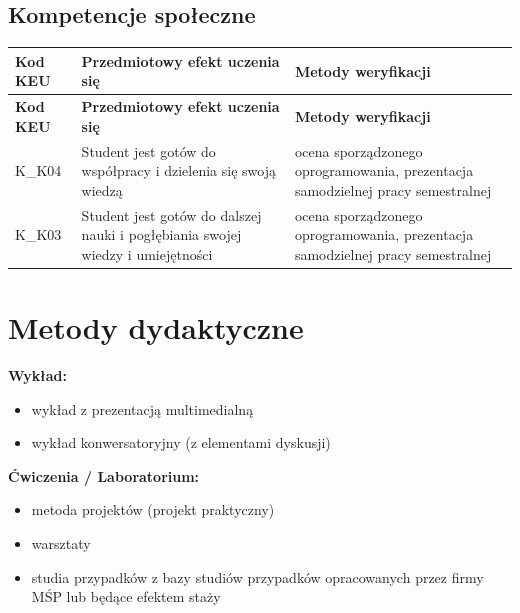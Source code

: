 \documentclass[12pt, a4paper]{article}
\newcommand{\thdrule}{\noalign{\global\setlength{\extrarowheight}{0pt}}}
\newcommand{\thdend}{\noalign{\global\setlength{\extrarowheight}{3pt}}}
\begin{document}
\subsection*{Kompetencje społeczne}
{\scriptsize
\begin{longtable}{m{1.6cm}m{9.0cm}m{4.2cm}}
\thdrule\toprule
\rowcolor{pjatkRed} {\color{white}\footnotesize\textbf{\vphantom{Ag}Kod KEU}} & {\color{white}\footnotesize\textbf{\vphantom{Ag}Przedmiotowy efekt uczenia się}} & {\color{white}\footnotesize\textbf{\vphantom{Ag}Metody weryfikacji}} \\
\midrule\thdend
\endfirsthead
\thdrule\toprule
\rowcolor{pjatkRed} {\color{white}\footnotesize\textbf{\vphantom{Ag}Kod KEU}} & {\color{white}\footnotesize\textbf{\vphantom{Ag}Przedmiotowy efekt uczenia się}} & {\color{white}\footnotesize\textbf{\vphantom{Ag}Metody weryfikacji}} \\
\midrule\thdend
\endhead
  \rowcolor{tableRowLight} K\_K04 & Student jest gotów do współpracy i dzielenia się swoją wiedzą & ocena sporządzonego oprogramowania, prezentacja samodzielnej pracy semestralnej \\
  \rowcolor{tableRowAlt} K\_K03 & Student jest gotów do dalszej nauki i pogłębiania swojej wiedzy i umiejętności & ocena sporządzonego oprogramowania, prezentacja samodzielnej pracy semestralnej \\
\bottomrule
\end{longtable}}

\section{Metody dydaktyczne}

\textbf{Wykład:}
\begin{itemize}
  \item wykład z prezentacją multimedialną
  \item wykład konwersatoryjny (z elementami dyskusji)
\end{itemize}
\vspace{4pt}
\textbf{Ćwiczenia / Laboratorium:}
\begin{itemize}
  \item metoda projektów (projekt praktyczny)
  \item warsztaty
  \item studia przypadków z bazy studiów przypadków opracowanych przez firmy MŚP lub będące efektem staży
\end{itemize}
\vspace{4pt}
\end{document}
